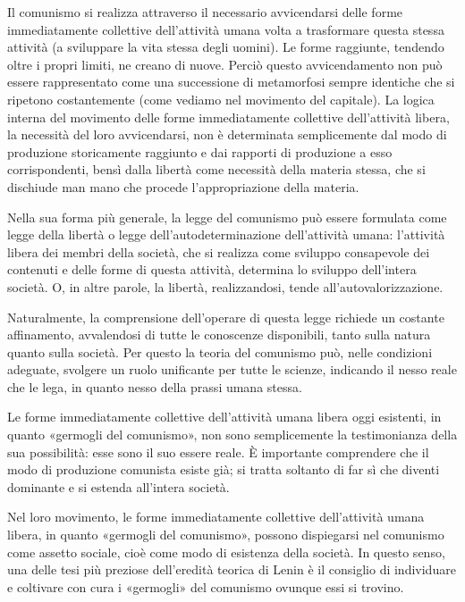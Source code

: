 \documentclass[12pt,a4paper,openany]{book}
\begin{document}
Il comunismo si realizza attraverso il necessario avvicendarsi delle forme immediatamente collettive dell'attività umana volta a trasformare questa stessa attività (a sviluppare la vita stessa degli uomini). Le forme raggiunte, tendendo oltre i propri limiti, ne creano di nuove. Perciò questo avvicendamento non può essere rappresentato come una successione di metamorfosi sempre identiche che si ripetono costantemente (come vediamo nel movimento del capitale). La logica interna del movimento delle forme immediatamente collettive dell'attività libera, la necessità del loro avvicendarsi, non è determinata semplicemente dal modo di produzione storicamente raggiunto e dai rapporti di produzione a esso corrispondenti, bensì dalla libertà come necessità della materia stessa, che si dischiude man mano che procede l'appropriazione della materia.

Nella sua forma più generale, la legge del comunismo può essere formulata come legge della libertà o legge dell'autodeterminazione dell'attività umana: l'attività libera dei membri della società, che si realizza come sviluppo consapevole dei contenuti e delle forme di questa attività, determina lo sviluppo dell'intera società. O, in altre parole, la libertà, realizzandosi, tende all'autovalorizzazione.

Naturalmente, la comprensione dell'operare di questa legge richiede un costante affinamento, avvalendosi di tutte le conoscenze disponibili, tanto sulla natura quanto sulla società. Per questo la teoria del comunismo può, nelle condizioni adeguate, svolgere un ruolo unificante per tutte le scienze, indicando il nesso reale che le lega, in quanto nesso della prassi umana stessa.

Le forme immediatamente collettive dell'attività umana libera oggi esistenti, in quanto «germogli del comunismo», non sono semplicemente la testimonianza della sua possibilità: esse sono il suo essere reale. È importante comprendere che il modo di produzione comunista esiste già; si tratta soltanto di far sì che diventi dominante e si estenda all'intera società.

Nel loro movimento, le forme immediatamente collettive dell'attività umana libera, in quanto «germogli del comunismo», possono dispiegarsi nel comunismo come assetto sociale, cioè come modo di esistenza della società. In questo senso, una delle tesi più preziose dell'eredità teorica di Lenin è il consiglio di individuare e coltivare con cura i «germogli» del comunismo ovunque essi si trovino.
\ifSubfilesClassLoaded{\setcounter{page}{19}}{}
\end{document}
